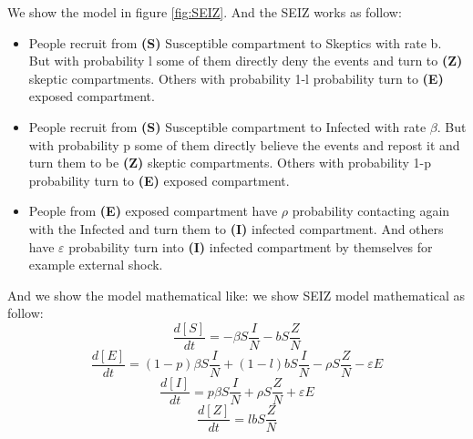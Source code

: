  We show the model in figure \ref{fig:SEIZ}. And the SEIZ works as follow:
 

 \begin{itemize}
\item People recruit from \textbf{(S)} Susceptible compartment to Skeptics with rate b. But with probability l some of them directly deny the events and turn to \textbf{(Z)} skeptic compartments. Others  with probability 1-l probability turn to \textbf{(E)} exposed compartment.
\item People recruit from \textbf{(S)} Susceptible compartment to Infected with rate $\beta$. But with probability p some of them directly believe the events and repost it and turn them to be \textbf{(Z)} skeptic compartments. Others  with probability 1-p probability turn to \textbf{(E)} exposed compartment.
\item  People from \textbf{(E)} exposed compartment have $\rho$ probability contacting again with the Infected and turn them to \textbf{(I)} infected compartment. And others have $\varepsilon$ probability turn into \textbf{(I)} infected compartment by themselves for example external shock.
\end{itemize}



And we show the model mathematical like:
we show SEIZ model mathematical as follow:
\begin{equation}
\frac{d[S]}{dt}=- \beta S\frac{I}{N}- b S\frac{Z}{N}
\end{equation}
\begin{equation}
\frac{d[E]}{dt}=(1-p)\beta S\frac{I}{N}+(1-l) b S\frac{I}{N}-\rho  S\frac{Z}{N}-\varepsilon E
\end{equation}
\begin{equation}
\frac{d[I]}{dt}=p\beta S\frac{I}{N}+\rho  S\frac{Z}{N}+\varepsilon E
\end{equation}
\begin{equation}
\frac{d[Z]}{dt}=lbS\frac{Z}{N} 
\end{equation}

